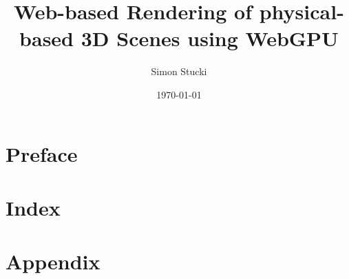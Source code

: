 \documentclass[a4paper, 11pt,abstract=on, listof=totocnumbered]{scrreprt}
\title{Web-based Rendering of physical-based 3D Scenes using WebGPU}
\author{Simon Stucki}
\date{\today}
\begin{document}
% 

\clearpage
\setcounter{page}{1}


\begin{abstract}

\end{abstract}

\chapter*{Preface}


\renewcommand{\contentsname}{Contents}
\tableofcontents

%

%

%

%

%

\chapter{Index}


\appendix
\chapter{Appendix}
\label{ch:appendix}
%
\end{document}
